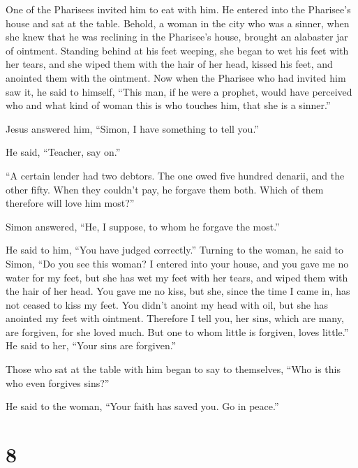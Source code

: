  One of the Pharisees invited him to eat with him. He
entered into the Pharisee's house and sat at the table. 
Behold, a woman in the city who was a sinner, when she knew that he was
reclining in the Pharisee's house, brought an alabaster jar of ointment.
 Standing behind at his feet weeping, she began to wet
his feet with her tears, and she wiped them with the hair of her head,
kissed his feet, and anointed them with the ointment. 
Now when the Pharisee who had invited him saw it, he said to himself,
``This man, if he were a prophet, would have perceived who and what kind
of woman this is who touches him, that she is a sinner.''

 Jesus answered him, ``Simon, I have something to tell
you.''

He said, ``Teacher, say on.''

 ``A certain lender had two debtors. The one owed five
hundred denarii, and the other fifty.  When they couldn't
pay, he forgave them both. Which of them therefore will love him most?''

 Simon answered, ``He, I suppose, to whom he forgave the
most.''

He said to him, ``You have judged correctly.''  Turning
to the woman, he said to Simon, ``Do you see this woman? I entered into
your house, and you gave me no water for my feet, but she has wet my
feet with her tears, and wiped them with the hair of her head.
 You gave me no kiss, but she, since the time I came in,
has not ceased to kiss my feet.  You didn't anoint my
head with oil, but she has anointed my feet with ointment.
 Therefore I tell you, her sins, which are many, are
forgiven, for she loved much. But one to whom little is forgiven, loves
little.''  He said to her, ``Your sins are forgiven.''

 Those who sat at the table with him began to say to
themselves, ``Who is this who even forgives sins?''

 He said to the woman, ``Your faith has saved you. Go in
peace.''

\hypertarget{section-7}{%
\section{8}\label{section-7}}

